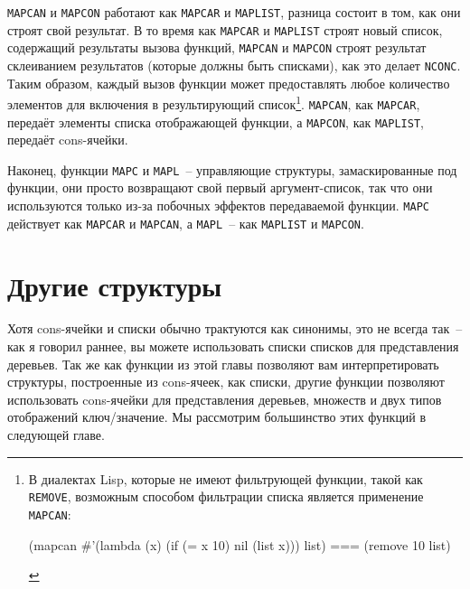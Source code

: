 \lstinline{MAPCAN} и \lstinline{MAPCON} работают как \lstinline{MAPCAR} и \lstinline{MAPLIST}, разница состоит
в том, как они строят свой результат. В то время как \lstinline{MAPCAR} и \lstinline{MAPLIST} строят
новый список, содержащий результаты вызова функций, \lstinline{MAPCAN} и \lstinline{MAPCON} строят
результат склеиванием результатов (которые должны быть списками), как это делает
\lstinline{NCONC}. Таким образом, каждый вызов функции может предоставлять любое количество
элементов для включения в результирующий список\footnote{В диалектах Lisp, которые не
  имеют фильтрующей функции, такой как \lstinline{REMOVE}, возможным способом фильтрации списка
  является применение \lstinline{MAPCAN}:

\begin{myverb}
(mapcan #'(lambda (x) (if (= x 10) nil (list x)))  list) === (remove 10 list)
\end{myverb}
}. \lstinline{MAPCAN}, как \lstinline{MAPCAR}, передаёт элементы списка отображающей функции, а
\lstinline{MAPCON}, как \lstinline{MAPLIST}, передаёт cons-ячейки.

Наконец, функции \lstinline{MAPC} и \lstinline{MAPL}~-- управляющие структуры, замаскированные под
функции, они просто возвращают свой первый аргумент-список, так что они используются
только из-за побочных эффектов передаваемой функции. \lstinline{MAPC} действует как
\lstinline{MAPCAR} и \lstinline{MAPCAN}, а \lstinline{MAPL}~-- как \lstinline{MAPLIST} и \lstinline{MAPCON}.


\section{Другие структуры}

Хотя cons-ячейки и списки обычно трактуются как синонимы, это не всегда так~-- как я
говорил раннее, вы можете использовать списки списков для представления деревьев. Так же
как функции из этой главы позволяют вам интерпретировать структуры, построенные из
cons-ячеек, как списки, другие функции позволяют использовать cons-ячейки для
представления деревьев, множеств и двух типов отображений ключ/значение. Мы рассмотрим
большинство этих функций в следующей главе.

